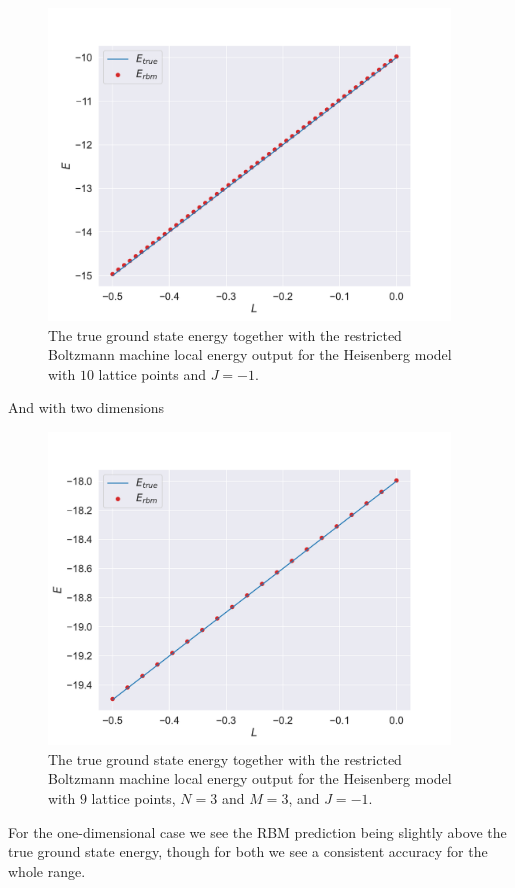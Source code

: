 \begin{figure}[H]
  \begin{center}
    \includegraphics[width=0.95\textwidth]{Figures/Plots/Heisen/val-true[L][-0.5-0.0][e=500][n=10][N=10][M=1][J=-1]}
  \end{center}
  \caption{The true ground state energy together with the restricted Boltzmann machine local energy output for the Heisenberg model with $10$ lattice points and $J=-1$.}
\end{figure}

And with two dimensions

\begin{figure}[H]
  \begin{center}
    \includegraphics[width=0.95\textwidth]{Figures/Plots/Heisen/val-true[L][-0.5-0.0][e=1000][n=9][N=3][M=3][J=-1]}
  \end{center}
  \caption{The true ground state energy together with the restricted Boltzmann machine local energy output for the Heisenberg model with $9$ lattice points, $N=3$ and $M=3$, and $J=-1$.} 
\end{figure}

For the one-dimensional case we see the RBM prediction being slightly above the true ground state energy, though for both we see a consistent accuracy for the whole range.

